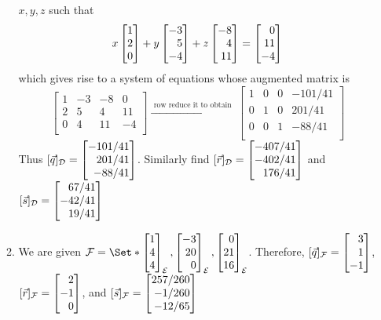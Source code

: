 \begin{exercises}
\begin{problist}
\begin{solution}
\begin{enumerate}
\begin{enumerate}
							$x, y, z$ such that \[ x \mat{1\\2\\0} + y \mat{-3\\5\\-4} +z 
							\mat{-8\\4\\11} = \mat{0\\11\\-4}\] which 
							gives rise to a system of equations whose augmented matrix is 
							\[
							\left[
							\begin{array}{ccc|c}
								1 & -3 & -8 & 0  \\
								2 & 5 & 4 & 11 \\
								0 & 4 & 11 & -4 \\
							\end{array}
							\right] \xrightarrow{\text{ row reduce it to obtain }}
							\left[
							\begin{array}{ccc|c}
								1 & 0 & 0 & -101/41  \\
								0 & 1 & 0 & 201/41 \\
								0 & 0 & 1 & -88/41\\
							\end{array}
							\right]
							\]
							Thus $[\vec{q}]_{\mathcal{D}} = \mat{-101/41 \\ 201/41 \\ -88/41}$. Similarly find 
							$[\vec{r}]_{\mathcal{D}} = \mat{-407/41 \\ -402/41 \\ 176/41}$ and $[\vec{s}]_{\mathcal{D}} = 
							\mat{67/41 \\ -42/41 \\ 19/41}$
						\item We are given $\mathcal{F} = \Set*{ \mat{1\\4\\4}_{\mathcal{E}}, \mat{-3\\20\\0}_{\mathcal{E}}, 
							\mat{0\\21\\16}_{\mathcal{E}}}$. Therefore,
							$[\vec{q}]_{\mathcal{F}} = \mat{3 \\ 1 \\ -1}$,
							$[\vec{r}]_{\mathcal{F}} = \mat{2 \\ -1 \\0}$,
							and $[\vec{s}]_{\mathcal{F}} = \mat{257/260 \\ -1/260 \\ -12/65}$
					\end{enumerate}
			\end{enumerate}
		\end{solution}


\end{problist}
\end{exercises}
